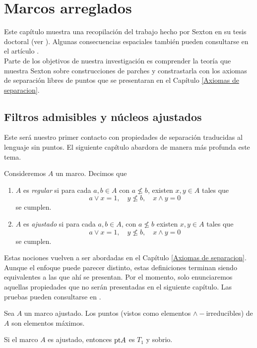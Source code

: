 \chapter{Marcos arreglados}\label{Parches}

Este capítulo muestra una recopilación del trabajo hecho por Sexton en su tesis doctoral (ver \cite{R.S.}). 
Algunas consecuencias espaciales también pueden consultarse en el artículo \cite{R.S.3}.\\

Parte de los objetivos de nuestra investigación es comprender la teoría que muestra Sexton sobre construcciones de parches 
y constrastarla con los axiomas de separación libres de puntos que se presentaran en el Capítulo \ref{Axiomas de separacion}.

\section{Filtros admisibles y núcleos ajustados}
Este será nuestro primer contacto con propiedades de separación traducidas al lenguaje sin puntos. El siguiente capítulo abardora de manera 
más profunda este tema.

\begin{dfn}
Consideremos $A$ un marco. Decimos que 
\begin{enumerate}
\item $A$ es \emph{regular} si para cada $a,b\in A$ con $a\nleq b$, existen $x,y\in A$ tales que 
\[
a\vee x=1, \quad y\nleq b, \quad x\wedge y=0
\]
se cumplen.
\item $A$ es \emph{ajustado} si para cada $a, b\in A$, con $a\nleq b$ existen $x, y\in A$ tales que
\[
a\vee x=1,\quad y\nleq b, \quad x\wedge y=0
\]
se cumplen.
\end{enumerate}
\end{dfn}

Estas nociones vuelven a ser abordadas en el Capítulo \ref{Axiomas de separacion}. Aunque el enfoque puede parecer distinto, estas definiciones terminan siendo equivalentes a las que ahí se presentan. Por el momento, solo enunciaremos aquellas propiedades que no serán presentadas en el siguiente 
capítulo. Las pruebas pueden consultarse en \cite{R.S.}.

\begin{lem}
    Sea $A$ un marco ajustado. Los puntos (vistos como elementos $\wedge-$irreducibles) de $A$ son elementos máximos.
\end{lem}

\begin{lem}
    Si el marco $A$ es ajustado, entonces $\mathrm{pt} A$ es $T_1$ y sobrio.
\end{lem}

